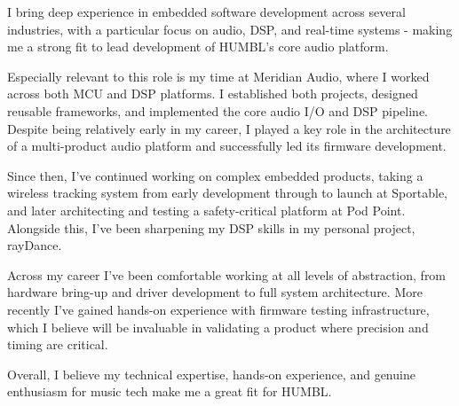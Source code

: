 \documentclass[11pt, a4paper]{awesome-cv}
\begin{document}
\begin{cvletter}
I bring deep experience in embedded software development across several industries, with a particular focus on audio, DSP, and real-time systems - making me a strong fit to lead development of HUMBL’s core audio platform.

Especially relevant to this role is my time at Meridian Audio, where I worked across both MCU and DSP platforms. I established both projects, designed reusable frameworks, and implemented the core audio I/O and DSP pipeline. Despite being relatively early in my career, I played a key role in the architecture of a multi-product audio platform and successfully led its firmware development.

Since then, I’ve continued working on complex embedded products, taking a wireless tracking system from early development through to launch at Sportable, and later architecting and testing a safety-critical platform at Pod Point. Alongside this, I’ve been sharpening my DSP skills in my personal project, rayDance.

Across my career I’ve been comfortable working at all levels of abstraction, from hardware bring-up and driver development to full system architecture. More recently I’ve gained hands-on experience with firmware testing infrastructure, which I believe will be invaluable in validating a product where precision and timing are critical.

Overall, I believe my technical expertise, hands-on experience, and genuine enthusiasm for music tech make me a great fit for HUMBL.


\end{cvletter}


\makeletterclosing
\end{document}
